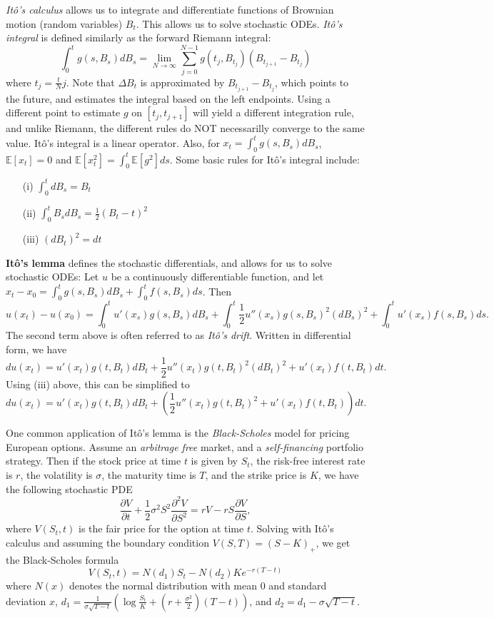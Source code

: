 \documentclass[12pt]{article}
\begin{document}
{\it It\^{o}'s calculus} allows us to integrate and differentiate functions
of Brownian motion (random variables) $B_t$.  This allows us to solve
stochastic ODEs.
{\it It\^{o}'s integral} is defined similarly as the forward Riemann integral:
$$
\int_0^t g(s, B_s) dB_s = \lim_{N\rightarrow\infty}
\sum_{j=0}^{N-1} g(t_j,B_{t_j})(B_{t_{j+1}} - B_{t_j})
$$
where $t_j = \frac{t}{N}j$.
Note that $\Delta B_t$ is approximated by $B_{t_{j+1}} - B_{t_j}$,
which points to the future, and estimates the integral based on the left
endpoints.
Using a different point to estimate $g$ on $[t_j, t_{j+1}]$ will yield a
different integration rule, and unlike Riemann, the different rules do
NOT necessarilly converge to the same value.
It\^{o}'s integral is a linear operator.
Also, for $x_t = \int_0^t g(s, B_s) dB_s$, $\mathbb{E}[x_t] = 0$ and
$\mathbb{E}[x_t^2] = \int_0^t \mathbb{E}[g^2] ds$.
Some basic rules for It\^{o}'s integral include:
\begin{itemize}
\item[(i)] $\int_0^t dB_s = B_t$
\item[(ii)] $\int_0^t B_s dB_s = \frac{1}{2}(B_t - t)^2$
\item[(iii)] $(dB_t)^2 = dt$
\end{itemize}

{\bf It\^{o}'s lemma} defines the stochastic differentials, and allows for
us to solve stochastic ODEs:
Let $u$ be a continuously differentiable function, and let
$x_t - x_0 = \int_0^t g(s, B_s) dB_s + \int_0^t f(s, B_s) ds$.
Then
$$
u(x_t) - u(x_0) = \int_0^t u'(x_s) g(s, B_s) dB_s 
+ \int_0^t \frac{1}{2}u''(x_s) g(s, B_s)^2 (dB_s)^2 
+ \int_0^t u'(x_s)f(s,B_s) ds.
$$
The second term above is often referred to as {\it It\^{o}'s drift}.
Written in differential form, we have
$$
du(x_t) = u'(x_t) g(t, B_t) dB_t + \frac{1}{2}u''(x_t) g(t, B_t)^2 (dB_t)^2
+ u'(x_t)f(t, B_t) dt.
$$
Using (iii) above, this can be simplified to
$$
du(x_t) = u'(x_t) g(t, B_t) dB_t + \left(\frac{1}{2}u''(x_t) g(t, B_t)^2
+ u'(x_t)f(t, B_t)\right) dt.
$$

One common application of It\^{o}'s lemma is the {\it Black-Scholes} model
for pricing European options.
Assume an {\it arbitrage free} market, and a {\it self-financing} portfolio
strategy.
Then if the stock price at time $t$ is given by $S_t$, the risk-free
interest rate is $r$, the volatility is $\sigma$, the maturity time is $T$,
and the strike price is $K$, we have the following stochastic PDE
$$
\frac{\partial V}{\partial t} + 
\frac{1}{2}\sigma^2 S^2 \frac{\partial^2 V}{\partial S^2}
= rV - rS\frac{\partial V}{\partial S},
$$
where $V(S_t, t)$ is the fair price for the option at time $t$.
Solving with It\^{o}'s calculus and assuming the boundary condition
$V(S,T) = (S - K)_+$, we get the Black-Scholes formula
$$
V(S_t,t) = N(d_1)S_t - N(d_2)Ke^{-r(T-t)}
$$
where
$N(x)$ denotes the normal distribution with mean $0$ and standard deviation
$x$,
$d_1 = \frac{1}{\sigma\sqrt{T-t}}\left(\log\frac{S_t}{K} + (r+\frac{\sigma^2}{2})(T-t)\right)$, and
$d_2 = d_1 - \sigma\sqrt{T-t}$.
\end{document}
